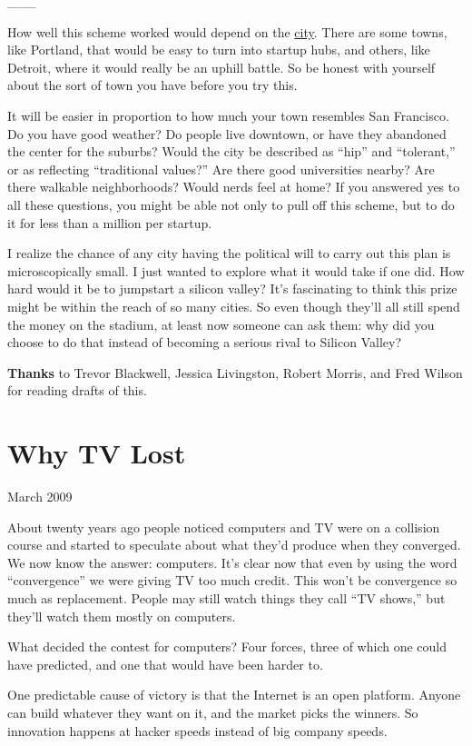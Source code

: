 \documentclass[12pt]{book}
\begin{document}
\_\_\_

How well this scheme worked would depend on the
\href{cities.html}{city}. There are some towns, like Portland, that
would be easy to turn into startup hubs, and others, like Detroit, where
it would really be an uphill battle. So be honest with yourself about
the sort of town you have before you try this.

It will be easier in proportion to how much your town resembles San
Francisco. Do you have good weather? Do people live downtown, or have
they abandoned the center for the suburbs? Would the city be described
as ``hip'' and ``tolerant,'' or as reflecting ``traditional values?''
Are there good universities nearby? Are there walkable neighborhoods?
Would nerds feel at home? If you answered yes to all these questions,
you might be able not only to pull off this scheme, but to do it for
less than a million per startup.

I realize the chance of any city having the political will to carry out
this plan is microscopically small. I just wanted to explore what it
would take if one did. How hard would it be to jumpstart a silicon
valley? It's fascinating to think this prize might be within the reach
of so many cities. So even though they'll all still spend the money on
the stadium, at least now someone can ask them: why did you choose to do
that instead of becoming a serious rival to Silicon Valley?


\textbf{Thanks} to Trevor Blackwell, Jessica Livingston, Robert Morris,
and Fred Wilson for reading drafts of this.
\chapter{Why TV Lost}

March 2009

About twenty years ago people noticed computers and TV were on a
collision course and started to speculate about what they'd produce when
they converged. We now know the answer: computers. It's clear now that
even by using the word ``convergence'' we were giving TV too much
credit. This won't be convergence so much as replacement. People may
still watch things they call ``TV shows,'' but they'll watch them mostly
on computers.

What decided the contest for computers? Four forces, three of which one
could have predicted, and one that would have been harder to.

One predictable cause of victory is that the Internet is an open
platform. Anyone can build whatever they want on it, and the market
picks the winners. So innovation happens at hacker speeds instead of big
company speeds.
\end{document}
